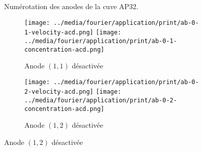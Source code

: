 \begin{figure}[h!]
  \begin{center}
    
    \caption{Numérotation des anodes de la cuve AP32.}
    \label{fig:anode-numerotations}
  \end{center}
\end{figure}

\begin{figure}[!h]
  \begin{center}
    \begin{subfigure}[t]{\textwidth}
      \begin{center}
        \texttt{[image: ../media/fourier/application/print/ab-0-1-velocity-acd.png]}
        \texttt{[image: ../media/fourier/application/print/ab-0-1-concentration-acd.png]}
        \caption{Anode $(1,1)$ désactivée}
      \end{center}
    \end{subfigure}
    \begin{subfigure}[t]{\textwidth}
      \begin{center}
        \texttt{[image: ../media/fourier/application/print/ab-0-2-velocity-acd.png]}
        \texttt{[image: ../media/fourier/application/print/ab-0-2-concentration-acd.png]}
        \caption{Anode $(1,2)$ désactivée}
      \end{center}
    \end{subfigure}


\end{center}
\end{figure}

